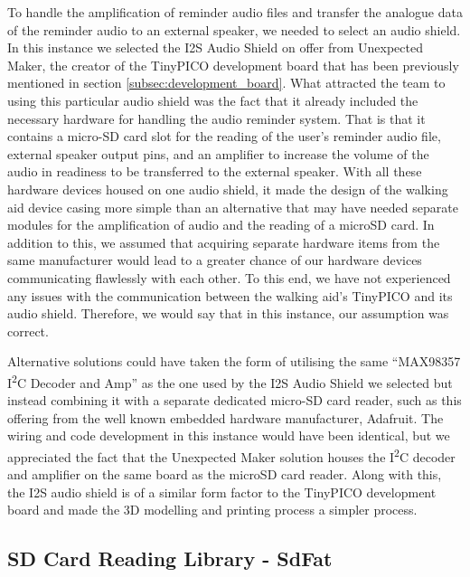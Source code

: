                     To handle the amplification of reminder audio files and transfer the analogue data of the reminder audio to an external speaker, we needed to select an audio shield. In this instance we selected the I2S Audio Shield \cite{unexpected_maker} on offer from Unexpected Maker, the creator of the TinyPICO development board that has been previously mentioned in section \ref{subsec:development_board}. What attracted the team to using this particular audio shield was the fact that it already included the necessary hardware for handling the audio reminder system. That is that it contains a micro-SD card slot for the reading of the user's reminder audio file, external speaker output pins, and an amplifier to increase the volume of the audio in readiness to be transferred to the external speaker. With all these hardware devices housed on one audio shield, it made the design of the walking aid device casing more simple than an alternative that may have needed separate modules for the amplification of audio and the reading of a microSD card. In addition to this, we assumed that acquiring separate hardware items from the same manufacturer would lead to a greater chance of our hardware devices communicating flawlessly with each other. To this end, we have not experienced any issues with the communication between the walking aid's TinyPICO and its audio shield. Therefore, we would say that in this instance, our assumption was correct.
                    
                    Alternative solutions could have taken the form of utilising the same ``MAX98357 I\textsuperscript{2}C Decoder and Amp'' \cite{unexpected_maker} as the one used by the I2S Audio Shield we selected but instead combining it with a separate dedicated micro-SD card reader, such as this offering \cite{ada_2022} from the well known embedded hardware manufacturer, Adafruit. The wiring and code development in this instance would have been identical, but we appreciated the fact that the Unexpected Maker solution houses the I\textsuperscript{2}C decoder and amplifier on the same board as the microSD card reader. Along with this, the I2S audio shield is of a similar form factor to the TinyPICO development board and made the 3D modelling and printing process a simpler process.
        
                \subsection{SD Card Reading Library - SdFat}
                \label{subsec:sdfat}
        
